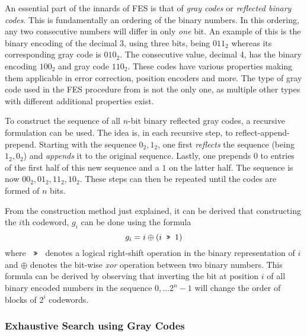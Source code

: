An essential part of the innards of FES is that of \textit{gray codes} or \textit{reflected binary codes}. This is fundamentally an ordering of the binary numbers. In this ordering, any two consecutive numbers will differ in only \textit{one} bit. An example of this is the binary encoding of the decimal 3, using three bits, being $011_2$ whereas its corresponding gray code is $010_2$.
The consecutive value, decimal 4, has the binary encoding $100_2$ and gray code $110_2$. These codes have various properties making them applicable in error correction, position encoders and more. The type of gray code used in the FES procedure from \cite{cryptoeprint:2010/313, cryptoeprint:2013/436} is not the only one, as multiple other types with different additional properties exist.

To construct the sequence of all $n$-bit binary reflected gray codes, a recursive formulation can be used. The idea is, in each recursive step, to reflect-append-prepend. Starting with the sequence $0_2, 1_2$, one first \textit{reflects} the sequence (being $1_2, 0_2$) and \textit{appends} it to the original sequence. Lastly, one prepends $0$ to entries of the first half of this new sequence and a $1$ on the latter half. The sequence is now $00_2, 01_2, 11_2, 10_2$. These steps can then be repeated until the codes are formed of $n$ bits.

From the construction method just explained, it can be derived that constructing the $i$th codeword, $g_i$ can be done using the formula
$$
    g_i = i \oplus (i \texttt{ >> } 1)
$$
where $\texttt{ >> }$ denotes a logical right-shift operation in the binary representation of $i$ and $\oplus$ denotes the bit-wise \textit{xor} operation between two binary numbers. This formula can be derived by observing that inverting the bit at position $i$ of all binary encoded numbers in the sequence $0,\dots 2^{n} - 1$ will change the order of blocks of $2^i$ codewords.

\subsubsection{Exhaustive Search using Gray Codes} \label{sec:prereq:fes:exh_g_code}

